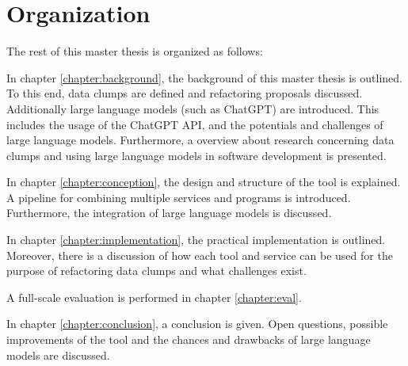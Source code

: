 \section{Organization}
The rest of this master thesis is organized as follows:

In chapter \ref{chapter:background}, the background of this master thesis  is outlined. To this end, data clumps are defined and refactoring proposals discussed. Additionally large language models (such as ChatGPT) are introduced. This includes the usage of the ChatGPT \ac{API}, and the potentials and challenges of large language models.  Furthermore, a overview about research  concerning data clumps and using large language models in software development is presented. 

In chapter \ref{chapter:conception}, the design and structure of the tool is explained. A pipeline for combining multiple services and programs is introduced. Furthermore, the integration of large language models is discussed. 

In chapter \ref{chapter:implementation}, the practical implementation is outlined.  Moreover, there is a discussion of how each tool and service can be used for the purpose of refactoring data clumps and what challenges exist. 

A full-scale evaluation is performed in chapter \ref{chapter:eval}.

In chapter \ref{chapter:conclusion}, a conclusion is given. Open questions, possible improvements of the tool and the chances and drawbacks of large language models are discussed.
